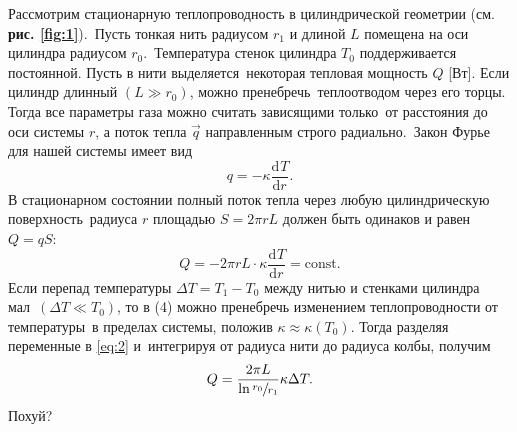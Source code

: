 \documentclass[a4paper, 12pt]{article}
\begin{document}
Рассмотрим стационарную теплопроводность в цилиндрической геометрии (см. \textbf{рис. \ref{fig:1}}).\
Пусть тонкая нить радиусом $r_1$ и длиной $L$ помещена на оси цилиндра радиусом $r_0$.\
Температура стенок цилиндра $T_0$ поддерживается постоянной. Пусть в нити выделяется\
некоторая тепловая мощность $Q$ [Вт]. Если цилиндр длинный $(L \gg r_0)$, можно пренебречь\
теплоотводом через его торцы. Тогда все параметры газа можно считать зависящими только\
от расстояния до оси системы $r$, а поток тепла $\vec{q}$ направленным строго радиально.\
Закон Фурье для нашей системы имеет вид
\begin{equation}
  q = -\kappa \frac{\mathrm{d}^{} T}{\mathrm{d} r^{}}.
\end{equation}
В стационарном состоянии полный поток тепла через любую цилиндрическую поверхность\
радиуса $r$ площадью $S = 2 \pi rL$ должен быть одинаков и равен $Q = qS$:
\begin{equation} \label{eq:2}
  Q = -2 \pi r L \cdot \kappa \frac{\mathrm{d}^{} T}{\mathrm{d} r^{}} = \text{const}.
\end{equation}
Если перепад температуры $\Delta T = T_1 - T_0$ между нитью и стенками цилиндра мал\
$(\Delta T \ll T_0)$, то в (4) можно пренебречь изменением теплопроводности от температуры\
в пределах системы, положив $\kappa \approx \kappa(T_0)$. Тогда разделяя переменные в \eqref{eq:2} и\
интегрируя от радиуса нити до радиуса колбы, получим
\begin{equation*}
Q = \frac{2 \pi L}{\ln{\sfrac{r_0}{r_1}}}\kappa \Delta T.
\end{equation*}
Похуй?
\end{document}
